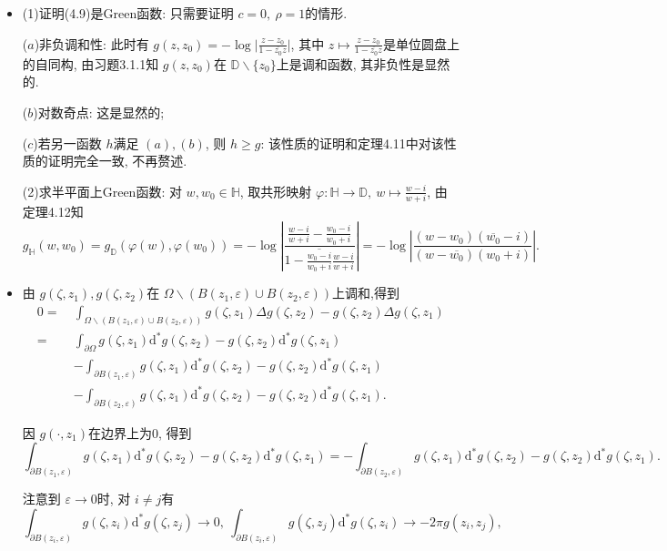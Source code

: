  \begin{itemize}
    \item[4.3.1]

(1)证明(4.9)是Green函数: 只需要证明 $c = 0,\ \rho = 1$的情形.

($a$)非负调和性: 此时有
$g(z,z_0) = -\log\big| \frac{z-z_0}{1-\overline{z_0}z} \big| $, 
其中 $z \mapsto \frac{z-z_0}{1-\overline{z_0}z}$是单位圆盘上的自同构, 
由习题3.1.1知 $g(z,z_0)$在 $\mathbb{D}\backslash \{z_0\}$上是调和函数, 
其非负性是显然的.

($b$)对数奇点: 这是显然的; 

($c$)若另一函数 $h$满足 $(a),(b)$, 则 $h\ge g$: 
该性质的证明和定理4.11中对该性质的证明完全一致, 不再赘述.

(2)求半平面上Green函数: 对 $w,w_0 \in \mathbb{H}$, 
取共形映射 $\varphi: \mathbb{H}\to \mathbb{D},\ w \mapsto \frac{w-i}{w+i}$, 
由定理4.12知
$$g_{\mathbb{H}}(w,w_0) = g_{\mathbb{D}}(\varphi(w),\varphi(w_0)) 
= -\log\left| \frac{\frac{w-i}{w+i}-\frac{w_0-i}{w_0+i}}
{1-\overline{\frac{w_0-i}{w_0+i}}\frac{w-i}{w+i}} \right| 
=-\log\left| \frac{(w-w_0)(\overline{w_0}-i)}{(w-\overline{w_0})(w_0+i)} \right|. $$

    \item[4.3.2]

由 $g(\zeta, z_1),g(\zeta, z_2)$在 
$\Omega\backslash(B(z_1,\varepsilon)\cup B(z_2,\varepsilon))$上调和,得到
\begin{align*}
    0 =\ &\int_{\Omega\backslash(B(z_1,\varepsilon)\cup B(z_2,\varepsilon))} g(\zeta,z_1)\Delta g(\zeta,z_2) - g(\zeta,z_2)\Delta g(\zeta,z_1) \\
       =\ &\int_{\partial \Omega}  g(\zeta,z_1)\mathrm{d}^* g(\zeta,z_2) - g(\zeta,z_2)\mathrm{d}^* g(\zeta,z_1)\\
       \ &-\int_{\partial B(z_1,\varepsilon)} g(\zeta,z_1)\mathrm{d}^* g(\zeta,z_2) - g(\zeta,z_2)\mathrm{d}^* g(\zeta,z_1)\\
        \ & - \int_{\partial B(z_2,\varepsilon)} g(\zeta,z_1)\mathrm{d}^* g(\zeta,z_2) - g(\zeta,z_2)\mathrm{d}^* g(\zeta,z_1).
\end{align*}

因 $g(\cdot, z_1)$在边界上为$0$, 得到
$$\int_{\partial B(z_1,\varepsilon)} g(\zeta,z_1)\mathrm{d}^* g(\zeta,z_2) 
- g(\zeta,z_2)\mathrm{d}^* g(\zeta,z_1) 
= - \int_{\partial B(z_2,\varepsilon)} g(\zeta,z_1)\mathrm{d}^* g(\zeta,z_2) 
- g(\zeta,z_2)\mathrm{d}^* g(\zeta,z_1).$$

注意到 $\varepsilon\to 0$时,  对 $i \not = j$有
$$\int_{\partial B(z_i,\varepsilon)} g(\zeta,z_i)\mathrm{d}^* g(\zeta,z_j)\to 0,
\ \int_{\partial B(z_i,\varepsilon)} g(\zeta,z_j)\mathrm{d}^* g(\zeta,z_i)\to -2\pi g(z_i,z_j),$$


\end{itemize}
